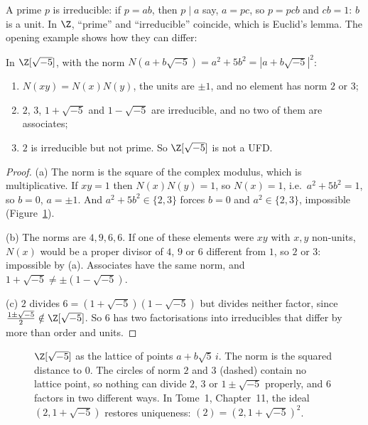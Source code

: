 A prime $p$ is irreducible: if $p=ab$, then $p\mid a$ say, $a=pc$, so $p=pcb$ and $cb=1$: $b$ is a unit. In $\Z$, ``prime'' and ``irreducible'' coincide, which is Euclid's lemma. The opening example shows how they can differ:

\begin{proposition}\label{prop:zm5}
In $\Z[\sqrt{-5}]$, with the norm $N(a+b\sqrt{-5})=a^2+5b^2=|a+b\sqrt{-5}|^2$:
\begin{enumerate}[label=(\alph*)]
\item $N(xy)=N(x)N(y)$, the units are $\pm1$, and no element has norm $2$ or $3$;
\item $2$, $3$, $1+\sqrt{-5}$ and $1-\sqrt{-5}$ are irreducible, and no two of them are associates;
\item $2$ is irreducible but not prime. So $\Z[\sqrt{-5}]$ is not a UFD.
\end{enumerate}
\end{proposition}
\begin{proof}
(a) The norm is the square of the complex modulus, which is multiplicative. If $xy=1$ then $N(x)N(y)=1$, so $N(x)=1$, i.e.\ $a^2+5b^2=1$, so $b=0$, $a=\pm1$. And $a^2+5b^2\in\{2,3\}$ forces $b=0$ and $a^2\in\{2,3\}$, impossible (Figure~\ref{fig:lattice}).

(b) The norms are $4,9,6,6$. If one of these elements were $xy$ with $x,y$ non-units, $N(x)$ would be a proper divisor of $4$, $9$ or $6$ different from $1$, so $2$ or $3$: impossible by (a). Associates have the same norm, and $1+\sqrt{-5}\ne\pm(1-\sqrt{-5})$.

(c) $2$ divides $6=(1+\sqrt{-5})(1-\sqrt{-5})$ but divides neither factor, since $\frac{1\pm\sqrt{-5}}2\notin\Z[\sqrt{-5}]$. So $6$ has two factorisations into irreducibles that differ by more than order and units.
\end{proof}

\begin{figure}[ht]
\centering
{}
\caption{$\Z[\sqrt{-5}]$ as the lattice of points $a+b\sqrt5\,i$. The norm is the squared distance to $0$. The circles of norm $2$ and $3$ (dashed) contain no lattice point, so nothing can divide $2$, $3$ or $1\pm\sqrt{-5}$ properly, and $6$ factors in two different ways. In Tome~1, Chapter~11, the ideal $(2,1+\sqrt{-5})$ restores uniqueness: $(2)=(2,1+\sqrt{-5})^2$.}
\label{fig:lattice}
\end{figure}

